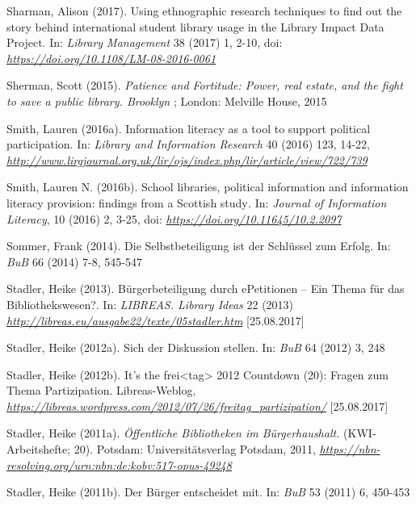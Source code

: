 \documentclass[a4paper,
fontsize=11pt,
oneside,
numbers=noperiodatend,
parskip=half-,
bibliography=totoc,
final
]{scrartcl}
\begin{document}
Sharman, Alison (2017). Using ethnographic research techniques to find
out the story behind international student library usage in the Library
Impact Data Project. In: \emph{Library Management} 38 (2017) 1, 2-10,
doi:
\href{https://doi.org/10.1108/LM-08-2016-0061}{\emph{https://doi.org/10.1108/LM-08-2016-0061}}

Sherman, Scott (2015). \emph{Patience and Fortitude: Power, real estate,
and the fight to save a public library. Brooklyn} ; London: Melville
House, 2015

Smith, Lauren (2016a). Information literacy as a tool to support
political participation. In: \emph{Library and Information Research} 40
(2016) 123, 14-22,
\href{http://www.lirgjournal.org.uk/lir/ojs/index.php/lir/article/view/722/739}{\emph{http://www.lirgjournal.org.uk/lir/ojs/index.php/lir/article/view/722/739}}

Smith, Lauren N. (2016b). School libraries, political information and
information literacy provision: findings from a Scottish study\emph{.}
In: \emph{Journal of Information Literacy}, 10 (2016) 2, 3-25, doi:
\href{http://dx.doi.org/10.11645/10.2.2097}{\emph{https://doi.org/10.11645/10.2.2097}}

Sommer, Frank (2014). Die Selbstbeteiligung ist der Schlüssel zum
Erfolg. In: \emph{BuB} 66 (2014) 7-8, 545-547

Stadler, Heike (2013). Bürgerbeteiligung durch ePetitionen -- Ein Thema
für das Bibliothekswesen?. In: \emph{LIBREAS. Library Ideas} 22 (2013)
\href{http://libreas.eu/ausgabe22/texte/05stadler.htm}{\emph{http://libreas.eu/ausgabe22/texte/05stadler.htm}}
{[}25.08.2017{]}

Stadler, Heike (2012a). Sich der Diskussion stellen. In: \emph{BuB} 64
(2012) 3, 248

Stadler, Heike (2012b). It's the frei\textless{}tag\textgreater{} 2012
Countdown (20): Fragen zum Thema Partizipation. Libreas-Weblog,
\href{https://libreas.wordpress.com/2012/07/26/freitag_partizipation/}{\emph{https://libreas.wordpress.com/2012/07/26/freitag\_partizipation/}}
{[}25.08.2017{]}

Stadler, Heike (2011a). \emph{Öffentliche Bibliotheken im
Bürgerhaushalt.} (KWI-Arbeitshefte; 20). Potsdam: Universitätsverlag
Potsdam, 2011,
\href{https://nbn-resolving.org/urn:nbn:de:kobv:517-opus-49248}{\emph{https://nbn-resolving.org/urn:nbn:de:kobv:517-opus-49248}}

Stadler, Heike (2011b). Der Bürger entscheidet mit. In: \emph{BuB} 53
(2011) 6, 450-453
\end{document}
